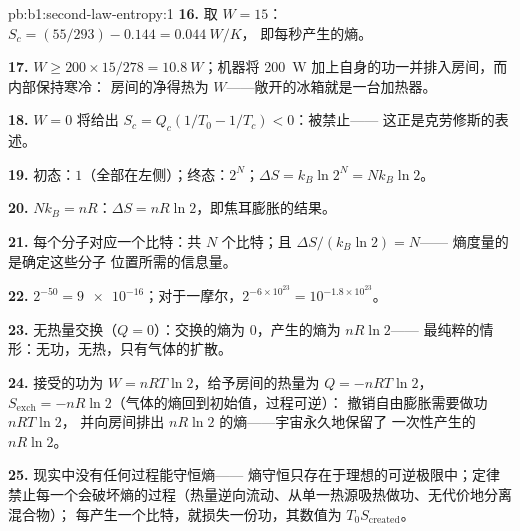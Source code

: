 \begin{solution}{pb:b1:second-law-entropy:1}
\textbf{16.} 取 $W = 15$：$S_c = (55/293) - 0.144 = \qty{0.044}{W/K}$，
即每秒产生的熵。

\textbf{17.} $W \geq 200 \times 15/278 = \qty{10.8}{W}$；机器将
\qty{200}{W} 加上自身的功一并排入房间，而内部保持寒冷：
房间的净得热为 $W$——敞开的冰箱就是一台加热器。

\textbf{18.} $W = 0$ 将给出 $S_c = Q_c(1/T_0 - 1/T_c) < 0$：被禁止——
这正是克劳修斯的表述。

\textbf{19.} 初态：$1$（全部在左侧）；终态：$2^N$；$\Delta S = k_B\ln2^N =
Nk_B\ln2$。

\textbf{20.} $Nk_B = nR$：$\Delta S = nR\ln2$，即焦耳膨胀的结果。

\textbf{21.} 每个分子对应一个比特：共 $N$ 个比特；且 $\Delta S/(k_B\ln2) = N$——
熵度量的是确定这些分子
位置所需的信息量。

\textbf{22.} $2^{-50} = \num{9e-16}$；对于一摩尔，$2^{-6\times10^{23}} =
10^{-1.8\times10^{23}}$。

\textbf{23.} 无热量交换（$Q = 0$）：交换的熵为 $0$，产生的熵为 $nR\ln2$——
最纯粹的情形：无功，无热，只有气体的扩散。

\textbf{24.} 接受的功为 $W = nRT\ln2$，给予房间的热量为 $Q = -nRT\ln2$，
$S_{\mathrm{exch}} = -nR\ln2$（气体的熵回到初始值，过程可逆）：
撤销自由膨胀需要做功 $nRT\ln2$，
并向房间排出 $nR\ln2$ 的熵——宇宙永久地保留了
一次性产生的 $nR\ln2$。

\textbf{25.} 现实中没有任何过程能守恒熵——
熵守恒只存在于理想的可逆极限中；定律
禁止每一个会破坏熵的过程（热量逆向流动、从单一热源吸热做功、无代价地分离混合物）；
每产生一个比特，就损失一份功，其数值为 $T_0S_{\mathrm{created}}$。
\end{solution}
